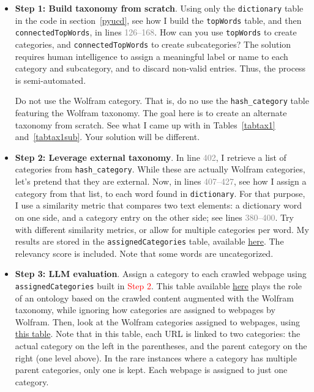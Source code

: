 \documentclass[oneside,10pt]{book}
\begin{document}
\begin{itemize}
\item[] {\bf Step 1:  Build taxonomy from scratch}. Using only the \texttt{dictionary} table in the code in section~\ref{pyucd},
 see how I build the \texttt{topWords} table, and then \texttt{connectedTopWords}, in lines \textcolor{gray}{126--168}.
 How can you use \texttt{topWords} to create categories, and \texttt{connectedTopWords} to create subcategories? The solution requires
 human intelligence to assign a meaningful label or name to each category and subcategory, and to discard non-valid entries. Thus, the process is 
semi-automated.  

\noindent Do not use the Wolfram category. That is, do no use the \texttt{hash\_category} table featuring the Wolfram taxonomy. The goal here is to create an alternate taxonomy from scratch.
See what I came up with in Tables~\ref{tabtax1} and~\ref{tabtax1sub}. Your solution will be different.
 \vspace{1ex}
\item[] {\bf Step 2:  Leverage external taxonomy}. In line \textcolor{gray}{402}, I retrieve a list of categories from \texttt{hash\_category}. 
While these are actually Wolfram categories, let's pretend that they are external. Now,  in lines \textcolor{gray}{407--427}, see how I assign a category from that list, to
 each word found in \texttt{dictionary}. For that purpose, I use a similarity metric  that compares two text elements: a dictionary word on one side, and a category entry on the other 
side; see lines \textcolor{gray}{380--400}.
 Try with different similarity metrics, or allow for multiple categories per word.   
My results are stored in the \texttt{assignedCategories} table, available 
\href{https://github.com/VincentGranville/Large-Language-Models/blob/main/xllm6/build-taxonomy/xllm6_assignedCategories.txt}{here}. 
The relevancy score is included. Note that some words are uncategorized.
\vspace{1ex}

\item[] {\bf Step 3:  LLM evaluation}. Assign a category to each crawled webpage using \texttt{assignedCategories} built in \textcolor{red}{Step 2}. This table
 available 
\href{https://github.com/VincentGranville/Large-Language-Models/blob/main/xllm6/build-taxonomy/xllm6_assignedCategories.txt}{here}
plays the role of an ontology based on the crawled content augmented with the Wolfram taxonomy, 
while ignoring how categories are assigned to webpages by Wolfram. 
Then, look at the Wolfram categories assigned to webpages, 
 using \href{https://github.com/VincentGranville/Large-Language-Models/blob/main/list_final_URLs_stats.txt}{this table}. Note that in this table, each URL is 
 linked to two categories:  the actual category on the left in the parentheses, and the parent category on the right (one level above). In the rare instances where 
a category has multiple parent categories, only one is kept. Each webpage is assigned to just one category.   


\end{itemize}
\end{document}

